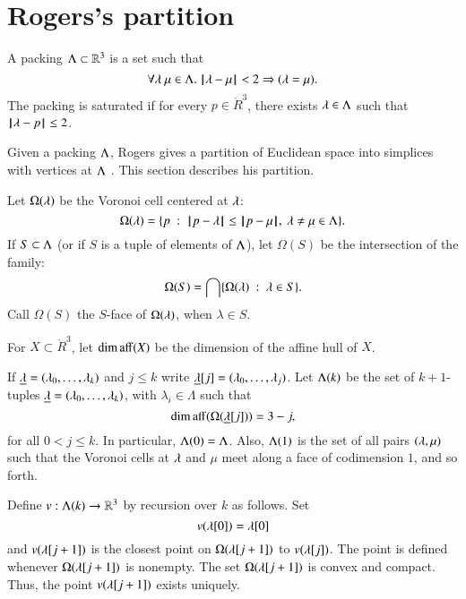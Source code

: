 \section{Rogers's partition}\label{sec:rogers}

\begin{definition}
A packing $\Lambda\subset \mathbb{R}^3$ is a set such that
$$\forall \lambda~\mu\in \Lambda.~  {\hskip0.1em|\hskip-0.15em|\hskip0.1em}\lambda - \mu{\hskip0.1em|\hskip-0.15em|\hskip0.1em} < 2 \Rightarrow (\lambda=\mu).$$
The packing is saturated if for every $p\in\ring{R}^3$,   there exists $\lambda\in\Lambda$
such that ${\hskip0.1em|\hskip-0.15em|\hskip0.1em}\lambda - p{\hskip0.1em|\hskip-0.15em|\hskip0.1em}\le 2$.
\end{definition}


Given a packing $\Lambda$, Rogers gives a partition of Euclidean space into
simplices with vertices at $\Lambda$ \cite{Rogers:1958:Packing}.   This section describes his partition.

Let $\Omega(\lambda)$  be the Voronoi cell centered at $\lambda$:
$$
  \Omega(\lambda) = \{p \ :\   {\hskip0.1em|\hskip-0.15em|\hskip0.1em}p - \lambda{\hskip0.1em|\hskip-0.15em|\hskip0.1em} 
\le {\hskip0.1em|\hskip-0.15em|\hskip0.1em}p - \mu{\hskip0.1em|\hskip-0.15em|\hskip0.1em},\ \lambda\ne\mu\in\Lambda\}.
$$
If $S\subset\Lambda$ (or if $S$ is a tuple of elements of $\Lambda$), 
let $\Omega(S)$ be the intersection of the family:
$$\Omega(S)  = \bigcap \{\Omega(\lambda)\ :\  \lambda\in S \}.$$
Call $\Omega(S)$ the $S$-face of $\Omega(\lambda)$, when $\lambda\in S$.

For $X\subset\ring{R}^3$,  let $\operatorname{dim\,aff}(X)$ be the dimension of the affine hull
of $X$.

If ${\underline{\lambda}}=(\lambda_0,\ldots,\lambda_k)$ and $j\le k$ write ${\underline{\lambda}}[j] = (\lambda_0,\ldots,\lambda_j)$.
Let $\Lambda(k)$ be the set of $k+1$-tuples ${\underline{\lambda}}=(\lambda_0,\ldots,\lambda_k)$, with
$\lambda_i\in\Lambda$ such
that 
\begin{equation}\label{eqn:omega-dim}
\operatorname{dim\,aff}(\Omega({\underline{\lambda}}[j])) = 3-j,
\end{equation}
for all $0<j\le k$.
In particular, $\Lambda(0)=\Lambda$.  Also, $\Lambda(1)$ is the
set of all pairs $(\lambda,\mu)$ such that the Voronoi cells at $\lambda$ and $\mu$ meet along
a face of codimension $1$, and
so forth.


Define $v:\Lambda(k)\to \mathbb{R}^3$ by recursion over $k$ as follows.
Set $$v(\lambda[0]) = \lambda[0]$$
and $v(\lambda[j+1])$ is the closest point on $\Omega(\lambda[j+1])$ to $v(\lambda[j])$.  The point is defined whenever $\Omega(\lambda[j+1])$ is nonempty.
The set $\Omega(\lambda[j+1])$ is convex and compact.  Thus, the point $v(\lambda[j+1])$ exists
uniquely.

